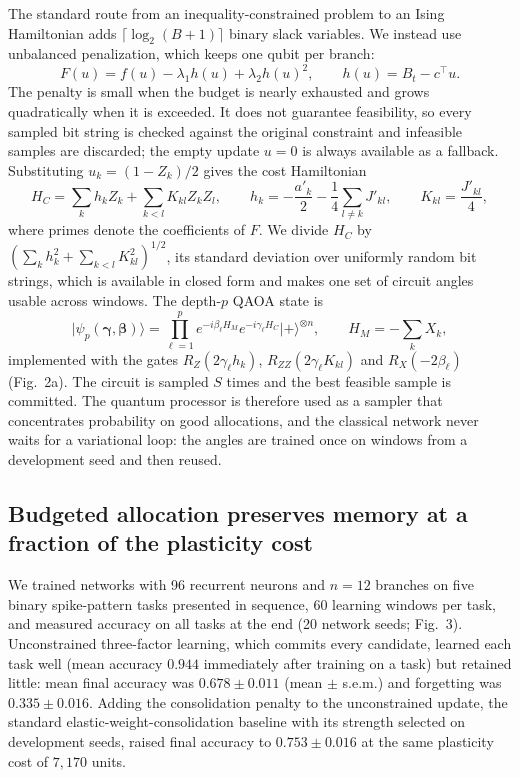 \documentclass[12pt,a4paper]{article}
\begin{document}
The standard route from an inequality-constrained problem to an Ising Hamiltonian adds $\lceil\log_{2}(B+1)\rceil$ binary slack variables\cite{lucas2014}. We instead use unbalanced penalization\cite{montanez2024}, which keeps one qubit per branch:
\begin{equation}
F(u)=f(u)-\lambda_{1}h(u)+\lambda_{2}h(u)^{2},\qquad h(u)=B_{t}-c^{\top}u .
\label{eq:unbalanced}
\end{equation}
The penalty is small when the budget is nearly exhausted and grows quadratically when it is exceeded. It does not guarantee feasibility, so every sampled bit string is checked against the original constraint and infeasible samples are discarded; the empty update $u=0$ is always available as a fallback. Substituting $u_{k}=(1-Z_{k})/2$ gives the cost Hamiltonian
\begin{equation}
H_{C}=\sum_{k}h_{k}Z_{k}+\sum_{k<l}K_{kl}Z_{k}Z_{l},\qquad h_{k}=-\frac{a'_{k}}{2}-\frac{1}{4}\sum_{l\neq k}J'_{kl},\qquad K_{kl}=\frac{J'_{kl}}{4},
\label{eq:ising}
\end{equation}
where primes denote the coefficients of $F$. We divide $H_{C}$ by $(\sum_{k}h_{k}^{2}+\sum_{k<l}K_{kl}^{2})^{1/2}$, its standard deviation over uniformly random bit strings, which is available in closed form and makes one set of circuit angles usable across windows. The depth-$p$ QAOA state\cite{farhi2014} is
\begin{equation}
\lvert\psi_{p}(\boldsymbol\gamma,\boldsymbol\beta)\rangle=\prod_{\ell=1}^{p}e^{-i\beta_{\ell}H_{M}}e^{-i\gamma_{\ell}H_{C}}\lvert+\rangle^{\otimes n},\qquad H_{M}=-\sum_{k}X_{k},
\label{eq:qaoa}
\end{equation}
implemented with the gates $R_{Z}(2\gamma_{\ell}h_{k})$, $R_{ZZ}(2\gamma_{\ell}K_{kl})$ and $R_{X}(-2\beta_{\ell})$ (Fig.~2a). The circuit is sampled $S$ times and the best feasible sample is committed. The quantum processor is therefore used as a sampler that concentrates probability on good allocations, and the classical network never waits for a variational loop: the angles are trained once on windows from a development seed and then reused.

\subsection*{Budgeted allocation preserves memory at a fraction of the plasticity cost}

We trained networks with 96 recurrent neurons and $n=12$ branches on five binary spike-pattern tasks presented in sequence, 60 learning windows per task, and measured accuracy on all tasks at the end (20 network seeds; Fig.~3). Unconstrained three-factor learning, which commits every candidate, learned each task well (mean accuracy $0.944$ immediately after training on a task) but retained little: mean final accuracy was $0.678\pm0.011$ (mean $\pm$ s.e.m.) and forgetting was $0.335\pm0.016$. Adding the consolidation penalty to the unconstrained update, the standard elastic-weight-consolidation baseline with its strength selected on development seeds, raised final accuracy to $0.753\pm0.016$ at the same plasticity cost of $7{,}170$ units.
\end{document}
